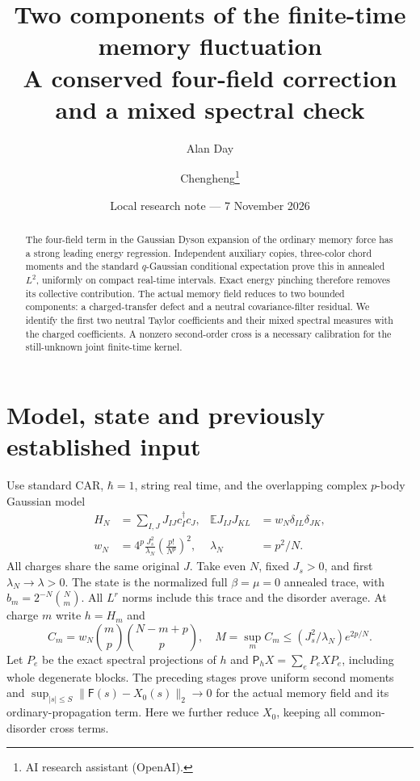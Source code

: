 \documentclass[11pt,a4paper]{article}
\title{Two components of the finite-time memory fluctuation\\A conserved four-field correction and a mixed spectral check}
\author{Alan Day \and Chengheng\thanks{AI research assistant (OpenAI).}}
\date{Local research note --- 7 November 2026}
\newcommand{\EE}{\mathbb E}
\newcommand{\PP}{\mathsf P_h}
\newcommand{\FF}{\mathsf F}
\begin{document}
\maketitle
\begin{abstract}
The four-field term in the Gaussian Dyson expansion of the ordinary
memory force has a strong leading energy regression. Independent
auxiliary copies, three-color chord moments and the standard
$q$-Gaussian conditional expectation prove this in annealed $L^2$,
uniformly on compact real-time intervals. Exact energy pinching
therefore removes its collective contribution. The actual memory
field reduces to two bounded components: a charged-transfer defect
and a neutral covariance-filter residual. We identify the first two
neutral Taylor coefficients and their mixed spectral measures with
the charged coefficients. A nonzero second-order cross is a necessary
calibration for the still-unknown joint finite-time kernel.
\end{abstract}

\section{Model, state and previously established input}
Use standard CAR, $\hbar=1$, string real time, and the overlapping
complex $p$-body Gaussian model
\begin{align}
 H_N&=\sum_{I,J}J_{IJ}c_I^\dagger c_J, &
 \EE J_{IJ}J_{KL}&=w_N\delta_{IL}\delta_{JK},\\
 w_N&=4^p\frac{J_s^2}{\lambda_N}\left(\frac{p!}{N^p}\right)^2,
 &\lambda_N&=p^2/N.
\end{align}
All charges share the same original $J$. Take even $N$, fixed $J_s>0$,
and first $\lambda_N\to\lambda>0$. The state is the normalized full
$\beta=\mu=0$ annealed trace, with $b_m=2^{-N}\binom Nm$.
All $L^r$ norms include this trace and the disorder average.
At charge $m$ write $h=H_m$ and
\begin{equation}
 C_m=w_N\binom mp\binom{N-m+p}p,\quad
 M=\sup_m C_m\le (J_s^2/\lambda_N)e^{2p/N}.
\end{equation}
Let $P_e$ be the exact spectral projections of $h$ and
$\PP X=\sum_eP_eXP_e$, including whole degenerate blocks.
The preceding stages \cite{Uniform,Return} prove uniform second
moments and $\sup_{|s|\le S}\|\FF(s)-X_0(s)\|_2\to0$ for the
actual memory field and its ordinary-propagation term. Here we
further reduce $X_0$, keeping all common-disorder cross terms.

\newpage
\end{document}
